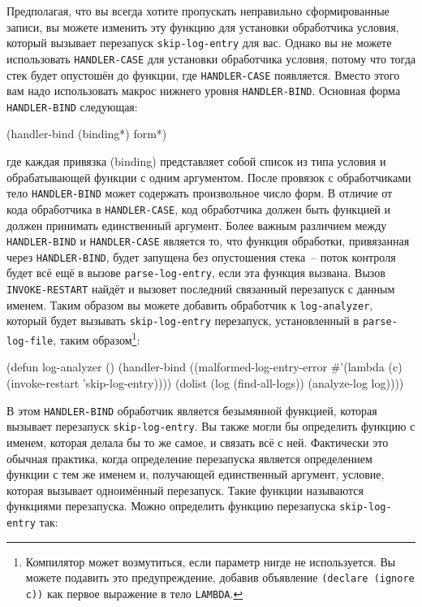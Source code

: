 Предполагая, что вы всегда хотите пропускать неправильно сформированные записи, вы можете
изменить эту функцию для установки обработчика условия, который вызывает перезапуск
\lstinline{skip-log-entry} для вас. Однако вы не можете использовать \lstinline{HANDLER-CASE} для
установки обработчика условия, потому что тогда стек будет опустошён до функции, где
\lstinline{HANDLER-CASE} появляется. Вместо этого вам надо использовать макрос нижнего уровня
\lstinline{HANDLER-BIND}. Основная форма \lstinline{HANDLER-BIND} следующая:

\begin{myverb}
(handler-bind (binding*) form*)
\end{myverb}

\noindent{}где каждая привязка (binding) представляет собой список из типа условия и
обрабатывающей функции с одним аргументом. После провязок с обработчиками тело
\lstinline{HANDLER-BIND} может содержать произвольное число форм. В отличие от кода
обработчика в \lstinline{HANDLER-CASE}, код обработчика должен быть функцией и должен
принимать единственный аргумент. Более важным различием между \lstinline{HANDLER-BIND} и
\lstinline{HANDLER-CASE} является то, что функция обработки, привязанная через
\lstinline{HANDLER-BIND}, будет запущена без опустошения стека~-- поток контроля будет всё
ещё в вызове \lstinline{parse-log-entry}, если эта функция вызвана. Вызов
\lstinline{INVOKE-RESTART} найдёт и вызовет последний связанный перезапуск с данным
именем. Таким образом вы можете добавить обработчик к \lstinline{log-analyzer}, который
будет вызывать \lstinline{skip-log-entry} перезапуск, установленный в
\lstinline{parse-log-file}, таким образом\footnote{Компилятор может возмутиться, если
  параметр нигде не используется. Вы можете подавить это предупреждение, добавив
  объявление \lstinline{(declare (ignore c))} как первое выражение в тело
\lstinline{LAMBDA}.}:

\begin{myverb}
(defun log-analyzer ()
  (handler-bind ((malformed-log-entry-error
                  #'(lambda (c)
                      (invoke-restart 'skip-log-entry))))
    (dolist (log (find-all-logs))
      (analyze-log log))))
\end{myverb}

В этом \lstinline{HANDLER-BIND} обработчик является безымянной функцией, которая вызывает
перезапуск \lstinline{skip-log-entry}. Вы также могли бы определить функцию с именем, которая
делала бы то же самое, и связать всё с ней. Фактически это обычная практика, когда
определение перезапуска является определением функции с тем же именем и, получающей
единственный аргумент, условие, которая вызывает одноимённый перезапуск. Такие функции
называются функциями перезапуска. Можно определить функцию перезапуска
\lstinline{skip-log-entry} так:

